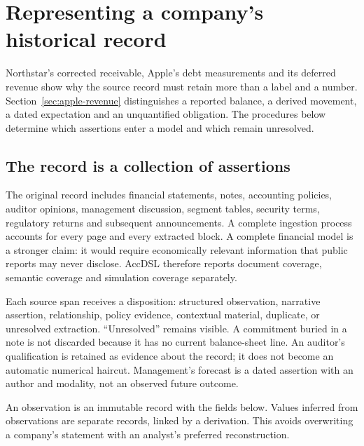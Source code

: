 \chapter{Representing a company's historical record}
\label{ch:history}

Northstar's corrected receivable, Apple's debt measurements and its deferred
revenue show why the source record must retain more than a label and a number.
Section~\ref{sec:apple-revenue} distinguishes a reported balance, a derived
movement, a dated expectation and an unquantified obligation. The procedures
below determine which assertions enter a model and which remain unresolved.

\section{The record is a collection of assertions}

The original record includes financial statements, notes, accounting policies,
auditor opinions, management discussion, segment tables, security terms,
regulatory returns and subsequent announcements. A complete ingestion process
accounts for every page and every extracted block. A complete financial model
is a stronger claim: it would require economically relevant information that
public reports may never disclose. AccDSL therefore reports document coverage,
semantic coverage and simulation coverage separately.

Each source span receives a disposition: structured observation, narrative
assertion, relationship, policy evidence, contextual material, duplicate, or
unresolved extraction. ``Unresolved'' remains visible. A commitment buried in a
note is not discarded because it has no current balance-sheet line. An auditor's
qualification is retained as evidence about the record; it does not become an
automatic numerical haircut. Management's forecast is a dated assertion with
an author and modality, not an observed future outcome.

An observation is an immutable record with the fields below. Values inferred
from observations are separate records, linked by a derivation. This avoids
overwriting a company's statement with an analyst's preferred reconstruction.

